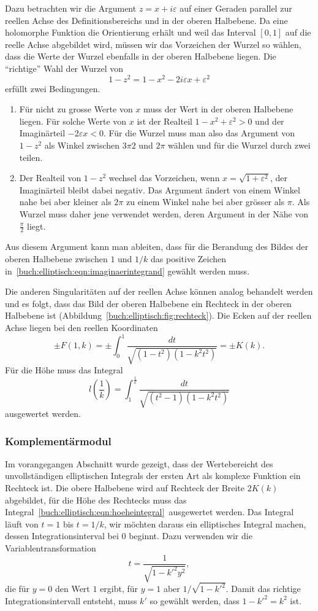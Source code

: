 Dazu betrachten wir die Argument $z=x+i\varepsilon$ auf einer Geraden
parallel zur reellen Achse des Definitionsbereichs und in der oberen
Halbebene.
Da eine holomorphe Funktion die Orientierung erhält und weil das
Interval $[0,1]$ auf die reelle Achse abgebildet wird, müssen wir das
Vorzeichen der Wurzel so wählen, dass die Werte der Wurzel ebenfalls
in der oberen Halbebene liegen.
Die ``richtige'' Wahl der Wurzel von 
\[
1-z^2 = 1-x^2-2i\varepsilon x + \varepsilon^2
\]
erfüllt zwei Bedingungen.
\begin{enumerate}
\item
Für nicht zu grosse Werte von $x$ muss der Wert in der oberen
Halbebene liegen.
Für solche Werte von $x$ ist der Realteil $1-x^2+\varepsilon^2>0$ und
der Imaginärteil $-2\varepsilon x<0$.
Für die Wurzel muss man also das Argument von $1-z^2$ als Winkel zwischen
$3\pi2$ und $2\pi$ wählen und für die Wurzel durch zwei teilen.
\item
Der Realteil von $1-z^2$ wechsel das Vorzeichen, wenn
$x=\sqrt{1+\varepsilon^2}$, der Imaginärteil bleibt dabei negativ.
Das Argument ändert von einem Winkel nahe bei aber kleiner als $2\pi$
zu einem Winkel nahe bei aber grösser als $\pi$.
Als Wurzel muss daher jene verwendet werden, deren Argument in der
Nähe von $\frac{\pi}2$ liegt.
\end{enumerate}
Aus diesem Argument kann man ableiten, dass für die Berandung des
Bildes der oberen Halbebene zwischen $1$ und $1/k$ das positive
Zeichen in~\eqref{buch:elliptisch:eqn:imaginaerintegrand}
gewählt werden muss.

Die anderen Singularitäten auf der reellen Achse können analog
behandelt werden und es folgt, dass das Bild der oberen Halbebene
ein Rechteck in der oberen Halbebene ist
(Abbildung~\ref{buch:elliptisch:fig:rechteck}).
Die Ecken auf der reellen Achse liegen bei den reellen Koordinaten
\[
\pm F(1,k)
=
\pm\int_0^1\frac{dt}{\sqrt{(1-t^2)(1-k^2t^2)}}
=
\pm K(k).
\]
Für die Höhe muss das Integral
\begin{equation}
l({\textstyle\frac{1}{k}})=\int_1^{\frac1{k}}
\frac{dt}{\sqrt{(t^2-1)(1-k^2t^2)}}
\label{buch:elliptisch:eqn:hoeheintegral}
\end{equation}
ausgewertet werden.

%
%
\subsubsection{Komplementärmodul}
Im vorangegangen Abschnitt wurde gezeigt, dass der Wertebereicht des
unvollständigen elliptischen Integrals der ersten Art als komplexe
Funktion ein Rechteck ist.
Die obere Halbebene wird auf Rechteck der Breite $2K(k)$ abgebildet,
für die Höhe des Rechtecks muss das
Integral~\eqref{buch:elliptisch:eqn:hoeheintegral} ausgewertet werden.
Das Integral läuft von $t=1$ bis $t=1/k$, wir möchten daraus ein
elliptisches Integral machen, dessen Integrationsinterval bei $0$
beginnt.
Dazu verwenden wir die Variablentransformation
\[
t = \frac{1}{\sqrt{1-k'^2y^2}},
\]
die für $y=0$ den Wert $1$ ergibt, für $y=1$ aber $1/\sqrt{1-k'^2}$.
Damit das richtige Integrationsintervall entsteht, muss $k'$ so gewählt
werden, dass $1-k'^2=k^2$ ist.

